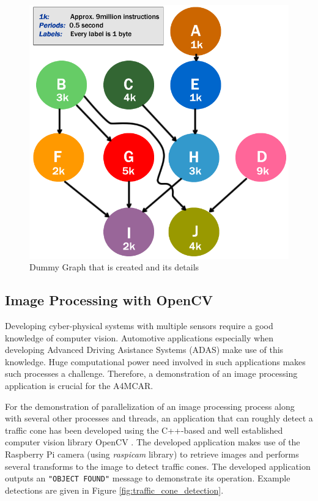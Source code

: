 \begin{figure}[!ht]
	\centering
	\captionsetup{justification=centering}
	\includegraphics[scale=0.4]{content/images/dummygraph.png}
	\caption{Dummy Graph that is created and its details}
	\label{fig:dummygraph}
\end{figure}


\subsection{Image Processing with OpenCV}
Developing cyber-physical systems with multiple sensors require a good knowledge of computer vision. Automotive applications especially when developing Advanced Driving Asistance Systems (ADAS) make use of this knowledge. Huge computational power need involved in such applications makes such processes a challenge. Therefore, a demonstration of an image processing application is crucial for the A4MCAR.

For the demonstration of parallelization of an image processing process along with several other processes and threads, an application that can roughly detect a traffic cone has been developed using the C++-based and well established computer vision library OpenCV \cite{opencv}. The developed application makes use of the Raspberry Pi camera (using \textit{raspicam} library) to retrieve images and performs several transforms to the image to detect traffic cones. The developed application outputs an \texttt{"OBJECT FOUND"} message to demonstrate its operation. Example detections are given in Figure \ref{fig:traffic_cone_detection}.

